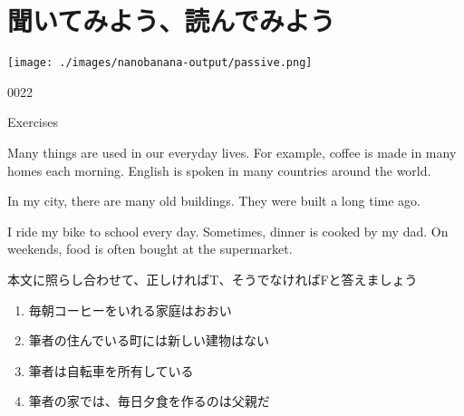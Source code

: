\documentclass[aspectratio=169,xcolor={dvipsnames,table}]{beamer}
\newcommand{\myaudio}[1]{\href{#1}{\faVolumeUp}}
\begin{document}
\section{聞いてみよう、読んでみよう}
\begin{frame}[plain]
 
\texttt{[image: ./images/nanobanana-output/passive.png]}

\vspace{-30pt}

\hfill{\tiny 0022}\,{\scriptsize \myaudio{./audio/051_passive_09.mp3}}

\end{frame}
\begin{frame}[plain,t]{Exercises}
\scriptsize

\vspace{-3pt}
\small
\begin{tcolorbox}[colframe=ForestGreen,
  colback=ForestGreen!10!white,
  colbacktitle=ForestGreen!40!white,
  coltitle=black, %
before upper={\setlength{\parindent}{1.25em}},
 title=次の英文を読み、あとの設問に答えましょう\mbox{}\hfill{\tiny 0022}\,{\scriptsize \myaudio{./audio/051_passive_09.mp3}}
]
Many things are used in our everyday lives\footnotemark.
For example\footnotemark, coffee is made in many homes each morning.
English is spoken in many countries around the world.

In my city, there are many old buildings.
They were built a long time ago.

I ride my bike to school every day.
Sometimes, dinner is cooked by my dad.
On weekends, food is often bought at the supermarket.

\end{tcolorbox}

{\scriptsize 本文に照らし合わせて、正しければT、そうでなければFと答えましょう}
\begin{enumerate}\scriptsize\setlength{\itemsep}{-2pt}
 \item<2-> 毎朝コーヒーをいれる家庭はおおい\hfill{}
 \item<2-> 筆者の住んでいる町には新しい建物はない\hfill{}
 \item<2-> 筆者は自転車を所有している\hfill{}
 \item<2-> 筆者の家では、毎日夕食を作るのは父親だ\hfill{}
\end{enumerate}


\end{frame}
\end{document}
